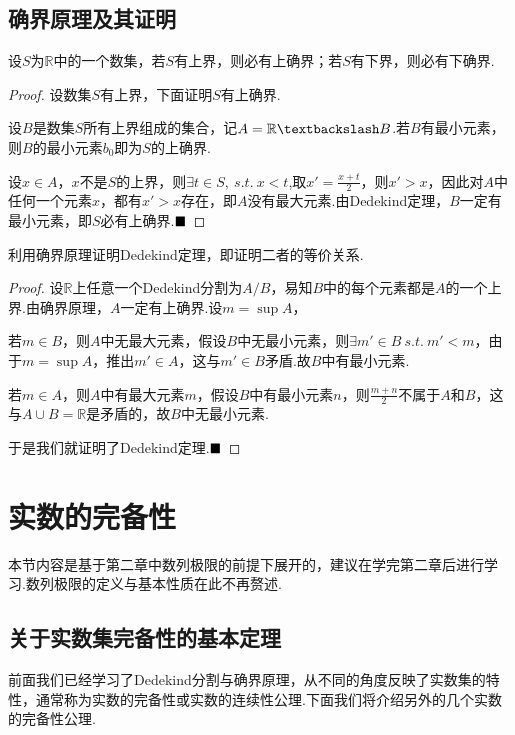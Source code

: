 \subsection{确界原理及其证明}
\begin{theorem}[确界原理]
	设$S$为$\mathbb{R}$中的一个数集，若$S$有上界，则必有上确界；若$S$有下界，则必有下确界.
\end{theorem}
\begin{proof}
	设数集$S$有上界，下面证明$S$有上确界.
	
	设$B$是数集$S$所有上界组成的集合，记$A=\mathbb{R}\textbackslash B$.若$B$有最小元素，则$B$的最小元素$b_0$即为$S$的上确界.
	
	设$x\in A$，$x$不是$S$的上界，则$\exists t\in S,\ s.t.\ x<t$,取$x'=\frac{x+t}{2}$，则$x'>x$，因此对$A$中任何一个元素$x$，都有$x'>x$存在，即$A$没有最大元素.由Dedekind定理，$B$一定有最小元素，即$S$必有上确界.$\hfill\blacksquare$
\end{proof}
\begin{example}
	利用确界原理证明Dedekind定理，即证明二者的等价关系.
\end{example}
\begin{proof}
	设$\mathbb{R}$上任意一个Dedekind分割为$A/B$，易知$B$中的每个元素都是$A$的一个上界.由确界原理，$A$一定有上确界.设$m=\sup A$，
	
	若$m\in B$，则$A$中无最大元素，假设$B$中无最小元素，则$\exists m'\in B\ s.t.\ m'<m$，由于$m=\sup A$，推出$m'\in A$，这与$m'\in B$矛盾.故$B$中有最小元素.
	
	若$m\in A$，则$A$中有最大元素$m$，假设$B$中有最小元素$n$，则$\frac{m+n}{2}$不属于$A$和$B$，这与$A\cup B=\mathbb{R}$是矛盾的，故$B$中无最小元素.
	
	于是我们就证明了Dedekind定理.$\hfill\blacksquare$
\end{proof}
\section{实数的完备性}
本节内容是基于第二章中数列极限的前提下展开的，建议在学完第二章后进行学习.数列极限的定义与基本性质在此不再赘述.

\subsection{关于实数集完备性的基本定理}
前面我们已经学习了Dedekind分割与确界原理，从不同的角度反映了实数集的特性，通常称为{\heiti 实数的完备性}或{\heiti 实数的连续性}公理.下面我们将介绍另外的几个实数的完备性公理.

